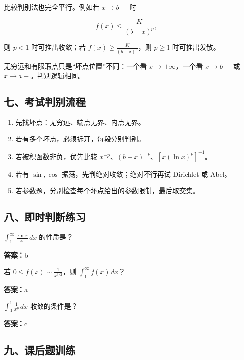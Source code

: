 比较判别法也完全平行。例如若 \(x\to b-\) 时

\[
      f(x)\le \frac{K}{(b-x)^p},
    \]

则 \(p<1\) 时可推出收敛；若 \(f(x)\ge \frac{K}{(b-x)^p}\)，则 \(p\ge1\) 时可推出发散。

\begin{notebox}
无穷远和有限瑕点只是“坏点位置”不同：一个看 \(x\to+\infty\)，一个看 \(x\to b-\) 或 \(x\to a+\)。判别逻辑相同。
\end{notebox}

\subsection*{七、考试判别流程}

\begin{enumerate}
 \item 先找坏点：无穷远、端点无界、内点无界。
 \item 若有多个坏点，必须拆开，每段分别判别。
 \item 若被积函数非负，优先比较 \(x^{-p}\)、\((b-x)^{-p}\)、\([x(\ln x)^p]^{-1}\)。
 \item 若有 \(\sin,\cos\) 振荡，先判绝对收敛；绝对不行再试 Dirichlet 或 Abel。
 \item 若参数题，分别检查每个坏点给出的参数限制，最后取交集。
 \end{enumerate}

\subsection*{八、即时判断练习}

\begin{quickcheck}
\(\int_1^\infty \frac{\sin x}{x}\,dx\) 的性质是？

\tcblower
\textbf{答案：}b
\end{quickcheck}

\begin{quickcheck}
若 \(0\le f(x)\sim \frac{1}{x^{3/2}}\)，则 \(\int_1^\infty f(x)\,dx\)？

\tcblower
\textbf{答案：}a
\end{quickcheck}

\begin{quickcheck}
\(\int_0^1 \frac{1}{x^p}\,dx\) 收敛的条件是？

\tcblower
\textbf{答案：}c
\end{quickcheck}

\subsection*{九、课后题训练}

